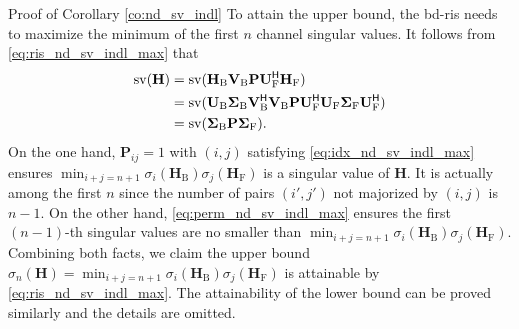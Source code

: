 \documentclass[journal]{IEEEtran}
\begin{document}
\begin{appendix}
\begin{subsection}{Proof of Corollary \ref{co:nd_sv_indl}}
		To attain the upper bound, the \gls{bd}-\gls{ris} needs to maximize the minimum of the first $n$ channel singular values.
		It follows from \eqref{eq:ris_nd_sv_indl_max} that
		\begin{equation*}
			\begin{split}
				\operatorname{sv}(\mathbf{H})
				& = \operatorname{sv}(\mathbf{H}_\mathrm{B} \mathbf{V}_\mathrm{B} \mathbf{P} \mathbf{U}_\mathrm{F}^\mathsf{H} \mathbf{H}_\mathrm{F})                                                                                                                         \\
				& = \operatorname{sv}(\mathbf{U}_\mathrm{B} \mathbf{\Sigma}_\mathrm{B} \mathbf{V}_\mathrm{B}^\mathsf{H} \mathbf{V}_\mathrm{B} \mathbf{P} \mathbf{U}_\mathrm{F}^\mathsf{H} \mathbf{U}_\mathrm{F} \mathbf{\Sigma}_\mathrm{F} \mathbf{U}_\mathrm{F}^\mathsf{H}) \\
				& = \operatorname{sv}(\mathbf{\Sigma}_\mathrm{B} \mathbf{P} \mathbf{\Sigma}_\mathrm{F}).
			\end{split}
		\end{equation*}
		On the one hand, $\mathbf{P}_{ij}=1$ with $(i, j)$ satisfying \eqref{eq:idx_nd_sv_indl_max} ensures $\min_{i+j=n+1} \sigma_i(\mathbf{H}_\mathrm{B}) \sigma_j(\mathbf{H}_\mathrm{F})$ is a singular value of $\mathbf{H}$.
		It is actually among the first $n$ since the number of pairs $(i',j')$ not majorized by $(i,j)$ is $n-1$.
		On the other hand, \eqref{eq:perm_nd_sv_indl_max} ensures the first $(n-1)$-th singular values are no smaller than $\min_{i+j=n+1} \sigma_i(\mathbf{H}_\mathrm{B}) \sigma_j(\mathbf{H}_\mathrm{F})$.
		Combining both facts, we claim the upper bound $\sigma_n(\mathbf{H}) = \min_{i+j=n+1} \sigma_i(\mathbf{H}_\mathrm{B}) \sigma_j(\mathbf{H}_\mathrm{F})$ is attainable by \eqref{eq:ris_nd_sv_indl_max}.
		The attainability of the lower bound can be proved similarly and the details are omitted.
	\end{subsection}


\end{appendix}
\end{document}

